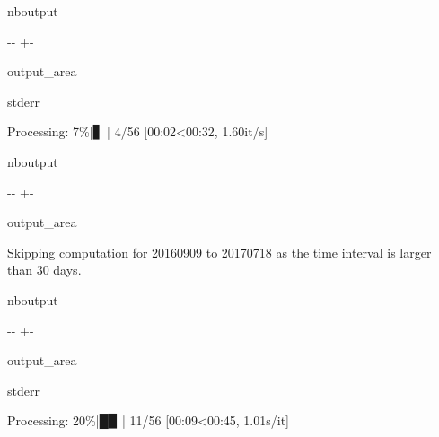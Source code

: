 \documentclass[letterpaper,10pt,english]{sphinxmanual}
\begin{document}
\begin{sphinxuseclass}{nboutput}
{

\kern-\sphinxverbatimsmallskipamount\kern-\baselineskip
\kern+\FrameHeightAdjust\kern-\fboxrule
\vspace{\nbsphinxcodecellspacing}

\begin{sphinxuseclass}{output_area}
\begin{sphinxuseclass}{stderr}


\begin{sphinxVerbatim}[commandchars=\\\{\}]
Processing:   7\%|▋         | 4/56 [00:02<00:32,  1.60it/s]
\end{sphinxVerbatim}



\end{sphinxuseclass}
\end{sphinxuseclass}
}

\end{sphinxuseclass}
\begin{sphinxuseclass}{nboutput}
{

\kern-\sphinxverbatimsmallskipamount\kern-\baselineskip
\kern+\FrameHeightAdjust\kern-\fboxrule
\vspace{\nbsphinxcodecellspacing}

\begin{sphinxuseclass}{output_area}
\begin{sphinxuseclass}{}


\begin{sphinxVerbatim}[commandchars=\\\{\}]
Skipping computation for 20160909 to 20170718 as the time interval is larger than 30 days.
\end{sphinxVerbatim}



\end{sphinxuseclass}
\end{sphinxuseclass}
}

\end{sphinxuseclass}
\begin{sphinxuseclass}{nboutput}
{

\kern-\sphinxverbatimsmallskipamount\kern-\baselineskip
\kern+\FrameHeightAdjust\kern-\fboxrule
\vspace{\nbsphinxcodecellspacing}

\begin{sphinxuseclass}{output_area}
\begin{sphinxuseclass}{stderr}


\begin{sphinxVerbatim}[commandchars=\\\{\}]
Processing:  20\%|█▉        | 11/56 [00:09<00:45,  1.01s/it]
\end{sphinxVerbatim}



\end{sphinxuseclass}
\end{sphinxuseclass}
}

\end{sphinxuseclass}
\end{document}
